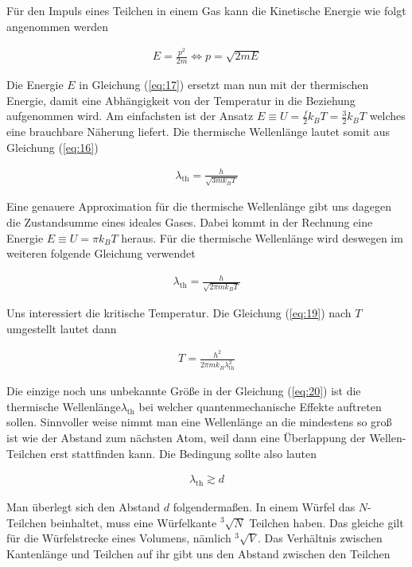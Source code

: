 Für den Impuls eines Teilchen in einem Gas kann die Kinetische Energie wie folgt angenommen werden

\begin{align}
  \label{eq:17}
  E=\frac{p^2}{2m} \Leftrightarrow p = \sqrt{2mE}
\end{align}

Die Energie \(E\) in Gleichung (\ref{eq:17}) ersetzt man nun mit der thermischen Energie, damit eine Abhängigkeit von der Temperatur in die Beziehung aufgenommen wird. Am einfachsten ist der Ansatz \(E\equiv U=\frac{f}{2}k_B T=\frac{3}{2}k_B T\) welches eine brauchbare Näherung liefert. Die thermische Wellenlänge lautet somit aus Gleichung (\ref{eq:16})

\begin{align}
  \label{eq:18}
  \lambda_{\text{th}} = \frac{h}{\sqrt{3mk_B T}}
\end{align}

Eine genauere Approximation für die thermische Wellenlänge gibt uns dagegen die Zustandsumme eines ideales Gases. Dabei kommt in der Rechnung eine Energie \(E\equiv U=\pi k_B T \) heraus. Für die thermische Wellenlänge wird deswegen im weiteren folgende Gleichung verwendet

\begin{align}
  \label{eq:19}
  \boxed{ \lambda_{\text{th}} = \frac{h}{\sqrt{2\pi mk_B T}} }
\end{align}

Uns interessiert die kritische Temperatur. Die Gleichung (\ref{eq:19}) nach \(T\) umgestellt lautet dann

\begin{align}
  \label{eq:20}
  T = \frac{h^2}{2\pi mk_B \lambda^2_{\text{th}}}
\end{align}

Die einzige noch uns unbekannte Größe in der Gleichung (\ref{eq:20}) ist die thermische Wellenlänge\(\lambda_{\text{th}}\) bei welcher quantenmechanische Effekte auftreten sollen. Sinnvoller weise nimmt man eine Wellenlänge an die mindestens so groß ist wie der Abstand zum nächsten Atom, weil dann eine Überlappung der Wellen-Teilchen erst stattfinden kann. Die Bedingung sollte also lauten

\begin{align}
  \label{eq:21}
  \lambda_{\text{th}} \gtrsim d
\end{align}

Man überlegt sich den Abstand \(d\) folgendermaßen. In einem Würfel das \(N\)-Teilchen beinhaltet, muss eine Würfelkante \(^3\sqrt{N}\) Teilchen haben. Das gleiche gilt für die Würfelstrecke eines Volumens, nämlich \(^3\sqrt{V}\). Das Verhältnis zwischen Kantenlänge und Teilchen auf ihr gibt uns den Abstand zwischen den Teilchen


